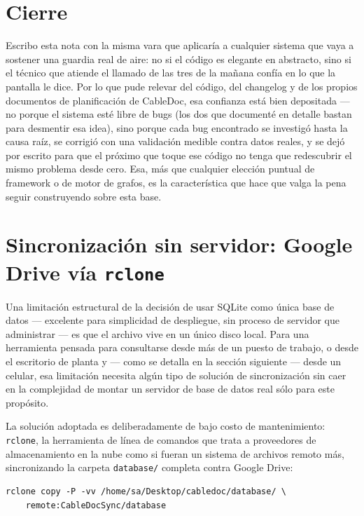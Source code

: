 \documentclass[11pt,twocolumn]{article}
\begin{document}
\section{Cierre}

Escribo esta nota con la misma vara que aplicaría a cualquier sistema que vaya a sostener una guardia real de aire: no si el código es elegante en abstracto, sino si el técnico que atiende el llamado de las tres de la mañana confía en lo que la pantalla le dice. Por lo que pude relevar del código, del changelog y de los propios documentos de planificación de CableDoc, esa confianza está bien depositada --- no porque el sistema esté libre de bugs (los dos que documenté en detalle bastan para desmentir esa idea), sino porque cada bug encontrado se investigó hasta la causa raíz, se corrigió con una validación medible contra datos reales, y se dejó por escrito para que el próximo que toque ese código no tenga que redescubrir el mismo problema desde cero. Esa, más que cualquier elección puntual de framework o de motor de grafos, es la característica que hace que valga la pena seguir construyendo sobre esta base.

\section{Sincronización sin servidor: Google Drive vía \texttt{rclone}}

Una limitación estructural de la decisión de usar SQLite como única base de datos --- excelente para simplicidad de despliegue, sin proceso de servidor que administrar --- es que el archivo vive en un único disco local. Para una herramienta pensada para consultarse desde más de un puesto de trabajo, o desde el escritorio de planta y --- como se detalla en la sección siguiente --- desde un celular, esa limitación necesita algún tipo de solución de sincronización sin caer en la complejidad de montar un servidor de base de datos real sólo para este propósito.

La solución adoptada es deliberadamente de bajo costo de mantenimiento: \texttt{rclone}, la herramienta de línea de comandos que trata a proveedores de almacenamiento en la nube como si fueran un sistema de archivos remoto más, sincronizando la carpeta \texttt{database/} completa contra Google Drive:

\begin{lstlisting}[language={},numbers=none]
rclone copy -P -vv /home/sa/Desktop/cabledoc/database/ \
    remote:CableDocSync/database
\end{lstlisting}
\end{document}
